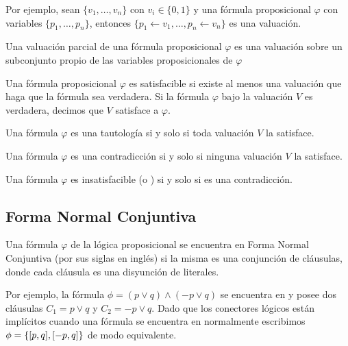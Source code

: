 Por ejemplo, sean $\{v_1, \ldots, v_n\}$ con $v_i \in \{0, 1\}$ y una fórmula proposicional $\varphi$ con variables $\{p_1, \ldots, p_n\}$, entonces $\{p_1 \leftarrow v_1, \ldots, p_n \leftarrow v_n\}$ es una valuación.

\begin{definition}
 Una valuación parcial de una fórmula proposicional $\varphi$ es una valuación sobre un subconjunto propio de las variables proposicionales de $\varphi$
\end{definition}

\begin{definition}
 Una fórmula proposicional $\varphi$ es satisfacible si existe al menos una valuación que haga que la fórmula sea verdadera. Si la fórmula $\varphi$ bajo la valuación $V$ es verdadera, decimos que $V$ satisface a $\varphi$.
\end{definition}

\begin{definition}
 Una fórmula $\varphi$ es una tautología si y solo si toda valuación $V$ la satisface.
\end{definition}

\begin{definition}
 Una fórmula $\varphi$ es una contradicción si y solo si ninguna valuación $V$ la satisface.
\end{definition}

\begin{definition}
 Una fórmula $\varphi$ es insatisfacible (o \unsat) si y solo si es una contradicción.
\end{definition}


\subsection{Forma Normal Conjuntiva}

\begin{definition}  Una fórmula $\varphi$ de
la lógica proposicional se encuentra en Forma Normal Conjuntiva (\cnf por sus
siglas en inglés) si la misma es una conjunción de cláusulas, donde cada
cláusula es una disyunción de literales. \end{definition}

Por ejemplo, la fórmula $\phi = (p \vee q) \wedge (-p \vee q)$ se encuentra
en \cnf y posee dos cláusulas $C_1 = p \vee q$ y $C_2 = -p \vee q$. Dado que los
conectores lógicos están implícitos cuando una fórmula se encuentra en \cnf
normalmente escribimos $\phi = \{[p, q], [-p, q]\}$ de modo equivalente.

